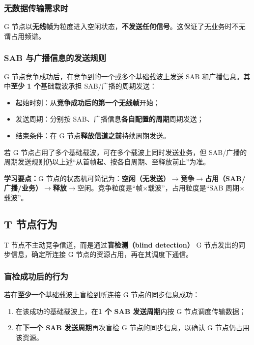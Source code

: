 \documentclass[11pt,a4paper]{ctexart}
\newcommand{\learn}[1]{\par\noindent\textcolor{blue!70!black}{\textbf{学习要点：}#1}\par}
\begin{document}
\subsubsection{无数据传输需求时}

G 节点以\textbf{无线帧}为粒度进入空闲状态，\textbf{不发送任何信号}。这保证了无业务时不无谓占用频谱。

\subsubsection{SAB 与广播信息的发送规则}

G 节点竞争成功后，在竞争到的一个或多个基础载波上发送 SAB 和广播信息。其中\textbf{至少 1 个}基础载波承担 SAB/广播的周期发送：

\begin{itemize}
  \item 起始时刻：从\textbf{竞争成功后的第一个无线帧}开始；
  \item 发送周期：分别按 SAB、广播信息\textbf{各自配置的周期}周期发送；
  \item 结束条件：在 G 节点\textbf{释放信道之前}持续周期发送。
\end{itemize}

若 G 节点占用了多个基础载波，可在多个载波上同时发送业务，但 SAB/广播的周期发送规则仍以上述“从首帧起、按各自周期、至释放前止”为准。

\learn{G 节点的状态机可简记为：\textbf{空闲（无发送）}$\rightarrow$\textbf{竞争}$\rightarrow$\textbf{占用（SAB/广播/业务）}$\rightarrow$\textbf{释放}$\rightarrow$空闲。竞争粒度是“帧$\times$载波”，占用粒度是“SAB 周期$\times$载波”。}

\subsection{T 节点行为}

T 节点不主动竞争信道，而是通过\textbf{盲检测（blind detection）} G 节点发出的同步信息，确定所连接 G 节点的资源占用，再在其调度下通信。

\subsubsection{盲检成功后的行为}

若在\textbf{至少一个}基础载波上盲检到所连接 G 节点的同步信息成功：

\begin{enumerate}
  \item 在该成功的基础载波上，在\textbf{1 个 SAB 发送周期}内按 G 节点调度传输数据；
  \item 在\textbf{下一个 SAB 发送周期}再次盲检 G 节点的同步信息，以确认 G 节点仍占用该资源。
\end{enumerate}
\end{document}
